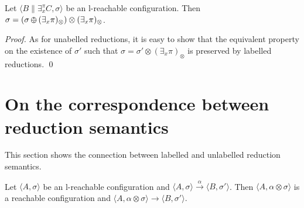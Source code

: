 \documentclass{llncs}
\def\C{{\mathcal C}}
\def\C{{\mathcal C}}
\def\odiv{\, {\ominus\hspace{-7.7pt} \div} \,}
\begin{document}

\begin{lemma}
\label{l-mono2}
Let 
$\langle B \parallel \exists_x^\pi C, \sigma \rangle$ 
be an l-reachable configuration. 
Then 
$\sigma = (\sigma \odiv (\exists_x \pi)_\otimes) \otimes (\exists_x \pi)_\otimes$.
\end{lemma}

\begin{proof}
As for unabelled reductions, it is easy to show that the equivalent property
on the existence of $\sigma'$ such that 
$\sigma = \sigma' \otimes (\exists_x \pi)_\otimes$ is preserved by 
labelled reductions. 
\qed
\end{proof}


\section{On the correspondence between reduction semantics}
\label{corres}
This section shows the connection between labelled and unlabelled reduction semantics.
%

\begin{theorem}[Soundness]
\label{sound}
Let $\langle A, \sigma \rangle$ be an l-reachable configuration and
$\langle A, \sigma \rangle \xrightarrow{\alpha} \langle B, \sigma' \rangle$. 
Then $\langle A, \alpha \otimes \sigma \rangle$ is a reachable configuration and
$\langle A, \alpha \otimes \sigma \rangle \to \langle B, \sigma' \rangle$.
\end{theorem}
\end{document}
